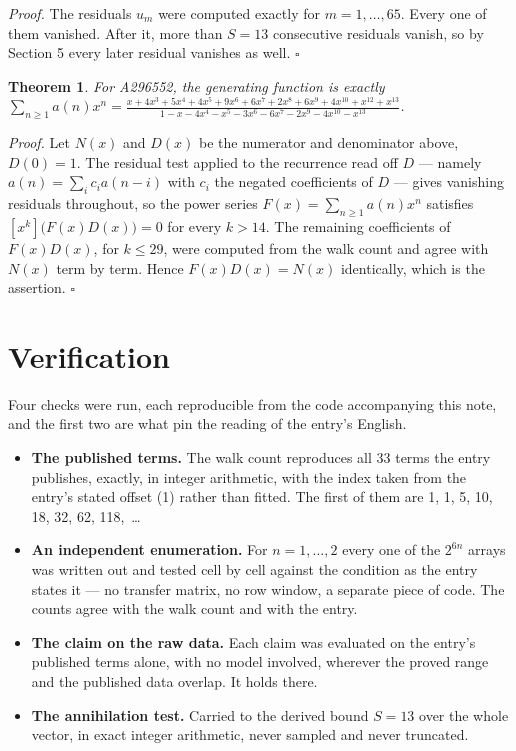 \documentclass[11pt]{article}
\newtheorem{theorem}{Theorem}
\theoremstyle{definition}
\begin{document}
{\itshape Proof.} The residuals $u_m$ were computed exactly for $m = 1,\dots,65$. Every one of them vanished. After it, more than $S = 13$ consecutive residuals vanish, so by Section 5 every later residual vanishes as well. $\square$

\begin{theorem} For A296552, the generating function is exactly $\sum_{n\ge 1} a(n)x^n = \frac{x + 4x^{3} + 5x^{4} + 4x^{5} + 9x^{6} + 6x^{7} + 2x^{8} + 6x^{9} + 4x^{10} + x^{12} + x^{13}}{1 - x - 4x^{4} - x^{5} - 3x^{6} - 6x^{7} - 2x^{9} - 4x^{10} - x^{13}}$.\end{theorem}

{\itshape Proof.} Let $N(x)$ and $D(x)$ be the numerator and denominator above, $D(0)=1$. The residual test applied to the recurrence read off $D$ --- namely $a(n) = \sum_i c_i a(n-i)$ with $c_i$ the negated coefficients of $D$ --- gives vanishing residuals throughout, so the power series $F(x)=\sum_{n\ge 1}a(n)x^n$ satisfies $[x^k]\bigl(F(x)D(x)\bigr) = 0$ for every $k > 14$. The remaining coefficients of $F(x)D(x)$, for $k \le 29$, were computed from the walk count and agree with $N(x)$ term by term. Hence $F(x)D(x) = N(x)$ identically, which is the assertion. $\square$

\section{Verification}

Four checks were run, each reproducible from the code accompanying this note, and the first two are what pin the reading of the entry's English.

\begin{itemize}

\item {\bfseries The published terms.} The walk count reproduces all 33 terms the entry publishes, exactly, in integer arithmetic, with the index taken from the entry's stated offset (1) rather than fitted. The first of them are 1, 1, 5, 10, 18, 32, 62, 118,~\dots

\item {\bfseries An independent enumeration.} For $n = 1,\dots,2$ every one of the $2^{6n}$ arrays was written out and tested cell by cell against the condition as the entry states it --- no transfer matrix, no row window, a separate piece of code. The counts agree with the walk count and with the entry.

\item {\bfseries The claim on the raw data.} Each claim was evaluated on the entry's published terms alone, with no model involved, wherever the proved range and the published data overlap. It holds there.

\item {\bfseries The annihilation test.} Carried to the derived bound $S = 13$ over the whole vector, in exact integer arithmetic, never sampled and never truncated.

\end{itemize}
\end{document}
